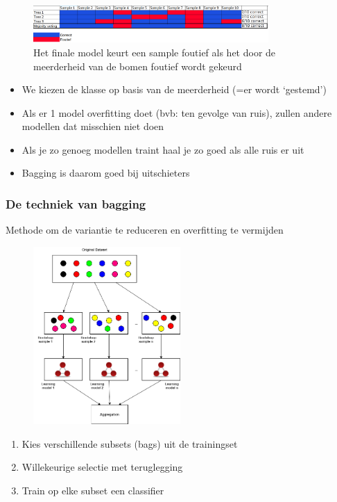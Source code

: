 \documentclass{article}
\begin{document}
\begin{figure}[H]
    \centering
    \includegraphics[width=0.8\textwidth]{bagging-majority-voting.png}
    \caption{Het finale model keurt een sample foutief als het door de meerderheid van de bomen foutief wordt gekeurd}
\end{figure}

\begin{itemize}
    \item We kiezen de klasse op basis van de meerderheid (=er wordt `gestemd')
    \item Als er 1 model overfitting doet (bvb: ten gevolge van ruis), zullen andere modellen dat misschien niet doen
    \item Als je zo genoeg modellen traint haal je zo goed als alle ruis er uit
    \item Bagging is daarom goed bij uitschieters
\end{itemize}

\subsubsection{De techniek van bagging}

Methode om de variantie te reduceren en overfitting te vermijden

\begin{figure}[H]
    \centering
    \includegraphics[width=0.5\textwidth]{bagging-techniek.png}
\end{figure}

\begin{enumerate}
    \item Kies verschillende subsets (bags) uit de trainingset
    \item Willekeurige selectie met teruglegging
    \item Train op elke subset een classifier
\end{enumerate}
\end{document}
